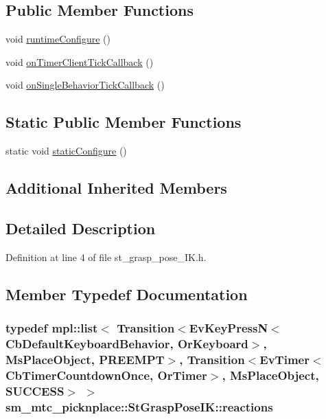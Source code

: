 \subsection*{Public Member Functions}
\begin{DoxyCompactItemize}
\item 
void \hyperlink{structsm__mtc__picknplace_1_1StGraspPoseIK_a32dfaaa38702efb00334200eeae6809b}{runtime\+Configure} ()
\item 
void \hyperlink{structsm__mtc__picknplace_1_1StGraspPoseIK_aa1ad4e3b00f88e9d54fc1dca178c12e0}{on\+Timer\+Client\+Tick\+Callback} ()
\item 
void \hyperlink{structsm__mtc__picknplace_1_1StGraspPoseIK_a5b338a999f3dfb502fbb426ed81f9df3}{on\+Single\+Behavior\+Tick\+Callback} ()
\end{DoxyCompactItemize}
\subsection*{Static Public Member Functions}
\begin{DoxyCompactItemize}
\item 
static void \hyperlink{structsm__mtc__picknplace_1_1StGraspPoseIK_a24e3893d657cffb288244dbc6ac8654f}{static\+Configure} ()
\end{DoxyCompactItemize}
\subsection*{Additional Inherited Members}


\subsection{Detailed Description}


Definition at line 4 of file st\+\_\+grasp\+\_\+pose\+\_\+\+I\+K.\+h.



\subsection{Member Typedef Documentation}
\subsubsection[{\texorpdfstring{reactions}{reactions}}]{\setlength{\rightskip}{0pt plus 5cm}typedef mpl\+::list$<$ Transition$<$Ev\+Key\+PressN$<$Cb\+Default\+Keyboard\+Behavior, {\bf Or\+Keyboard}$>$, {\bf Ms\+Place\+Object}, {\bf P\+R\+E\+E\+M\+PT}$>$, Transition$<$Ev\+Timer$<$Cb\+Timer\+Countdown\+Once, {\bf Or\+Timer}$>$, {\bf Ms\+Place\+Object}, {\bf S\+U\+C\+C\+E\+SS}$>$ $>$ {\bf sm\+\_\+mtc\+\_\+picknplace\+::\+St\+Grasp\+Pose\+I\+K\+::reactions}}\hypertarget{structsm__mtc__picknplace_1_1StGraspPoseIK_a74d9652fe8af4631334c81dd4ca54ce7}{}\label{structsm__mtc__picknplace_1_1StGraspPoseIK_a74d9652fe8af4631334c81dd4ca54ce7}


